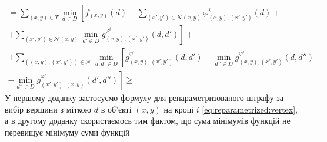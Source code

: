 \begin{equation*}
\begin{gathered}
    = \sum \limits_{\left(x, y \right) \in T}
        \min \limits_{d \in D} \left[
            f_{\left(x, y \right)} \left( d \right) -
            \sum \limits_{\left(x', y' \right) \in \mathcal{N} \left(x, y \right)}
                \varphi_{\left(x, y \right), \left(x', y' \right)}^i
                    \left(d \right) + \right. \\
                \left. + \sum \limits_{\left(x', y' \right) \in \mathcal{N} \left(x, y \right)}
                \min \limits_{d' \in D}
                    g_{\left(x, y \right), \left(x', y' \right)}^{\varphi^i}
                        \left(d, d' \right)
        \right] + \\
    + \sum \limits_{\left(\left(x, y \right), \left(x', y' \right)\right)\in\mathcal{N}}
        \min \limits_{d,d' \in D} \left[
            g_{\left(x, y \right), \left(x', y' \right)}^{\varphi^i}
                \left(d, d' \right) -
            \min \limits_{d'' \in D}
                g_{\left(x, y \right), \left(x', y' \right)}^{\varphi^i}
                    \left(d, d'' \right) - \right. \\
            \left. - \min \limits_{d'' \in D}
                g_{\left(x', y' \right), \left(x, y \right)}^{\varphi^i}
                    \left(d', d'' \right)
        \right] \ge
\end{gathered}
\end{equation*}
У першому доданку
застосуємо формулу для репараметризованого штрафу за вибір вершини з міткою $d$
в об'єкті $\left(x, y \right)$ на кроці $i$ \eqref{eq:reparametrized:vertex},
а в другому доданку скористаємось тим фактом,
що сума мінімумів функцій не перевищує мінімуму суми функцій

